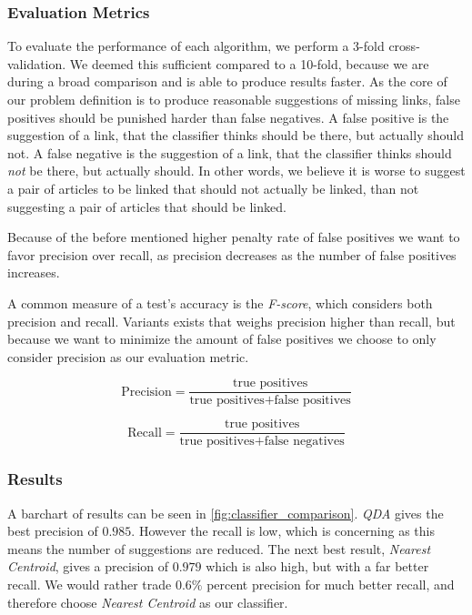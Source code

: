 \subsubsection{Evaluation Metrics}\label{evaluation_metric}
To evaluate the performance of each algorithm, we perform a 3-fold cross-validation. We deemed this sufficient compared to a 10-fold, because we are during a broad comparison and is able to produce results faster.
As the core of our problem definition is to produce reasonable suggestions of missing links, false positives should be punished harder than false negatives. A false positive is the suggestion of a link, that the classifier thinks should be there, but actually should not. A false negative is the suggestion of a link, that the classifier thinks should \emph{not} be there, but actually should. In other words, we believe it is worse to suggest a pair of articles to be linked that should not actually be linked, than not suggesting a pair of articles that should be linked. 

Because of the before mentioned higher penalty rate of false positives we want to favor precision over recall, as precision decreases as the number of false positives increases.

A common measure of a test's accuracy is the \emph{F-score}, which considers both precision and recall. Variants exists that weighs precision higher than recall, but because we want to minimize the amount of false positives we choose to only consider precision as our evaluation metric.

\begin{equation}\label{eq:precision}
\text{Precision} = \frac{\text{true positives}}{\text{true positives} + \text{false positives}}
\end{equation}

\begin{equation}\label{eq:recall}
\text{Recall} = \frac{\text{true positives}}{\text{true positives} + \text{false negatives}}
\end{equation}


\subsubsection{Results}
A barchart of results can be seen in \cref{fig:classifier_comparison}. \emph{QDA} gives the best precision of $0.985$. However the recall is low, which is concerning as this means the number of suggestions are reduced. The next best result, \emph{Nearest Centroid}, gives a precision of $0.979$ which is also high, but with a far better recall. We would rather trade $0.6\%$ percent precision for much better recall, and therefore choose \emph{Nearest Centroid} as our classifier.

